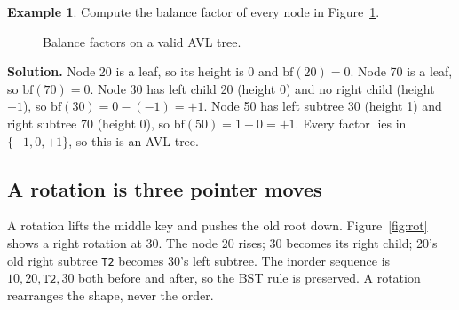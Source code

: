 \documentclass[11pt]{article}
\theoremstyle{definition}
\newtheorem{example}{Example}[section]
\begin{document}
\begin{example}
Compute the balance factor of every node in Figure~\ref{fig:bf}.

\begin{figure}[h]
  \centering
  \caption{Balance factors on a valid AVL tree.}
  \label{fig:bf}
\end{figure}

\textbf{Solution.} Node 20 is a leaf, so its height is 0 and
$\mathrm{bf}(20)=0$. Node 70 is a leaf, so $\mathrm{bf}(70)=0$. Node 30 has
left child 20 (height 0) and no right child (height $-1$), so
$\mathrm{bf}(30)=0-(-1)=+1$. Node 50 has left subtree 30 (height 1) and
right subtree 70 (height 0), so $\mathrm{bf}(50)=1-0=+1$. Every factor lies in
$\{-1,0,+1\}$, so this is an AVL tree.
\end{example}

\subsection{A rotation is three pointer moves}

A rotation lifts the middle key and pushes the old root down. Figure~\ref{fig:rot}
shows a right rotation at 30. The node 20 rises; 30 becomes its right child;
20's old right subtree \texttt{T2} becomes 30's left subtree. The inorder
sequence is $10,20,\texttt{T2},30$ both before and after, so the BST rule is
preserved. A rotation rearranges the shape, never the order.
\end{document}

